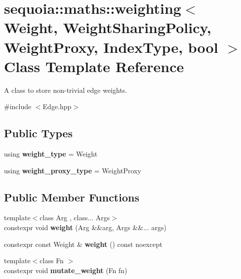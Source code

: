 \hypertarget{classsequoia_1_1maths_1_1weighting}{}\section{sequoia\+::maths\+::weighting$<$ Weight, Weight\+Sharing\+Policy, Weight\+Proxy, Index\+Type, bool $>$ Class Template Reference}
\label{classsequoia_1_1maths_1_1weighting}


A class to store non-\/trivial edge weights.  




{\ttfamily \#include $<$Edge.\+hpp$>$}

\subsection*{Public Types}
\begin{DoxyCompactItemize}
\item 
\mbox{\label{classsequoia_1_1maths_1_1weighting_a75487b5c1afdbff2be1311e6f55301e7}} 
using {\bfseries weight\+\_\+type} = Weight
\item 
\mbox{\label{classsequoia_1_1maths_1_1weighting_a80e6ac2ea9bf08c9094aecbc491d6db8}} 
using {\bfseries weight\+\_\+proxy\+\_\+type} = Weight\+Proxy
\end{DoxyCompactItemize}
\subsection*{Public Member Functions}
\begin{DoxyCompactItemize}
\item 
\mbox{\label{classsequoia_1_1maths_1_1weighting_aecf47e72218ef625141a6d3b18a07ddf}} 
{\footnotesize template$<$class Arg , class... Args$>$ }\\constexpr void {\bfseries weight} (Arg \&\&arg, Args \&\&... args)
\item 
\mbox{\label{classsequoia_1_1maths_1_1weighting_a53ce42cb7ec90e6eb370682e81bde115}} 
constexpr const Weight \& {\bfseries weight} () const noexcept
\item 
\mbox{\label{classsequoia_1_1maths_1_1weighting_ad38ca7bf1e4b385abda4e2c5020ed840}} 
{\footnotesize template$<$class Fn $>$ }\\constexpr void {\bfseries mutate\+\_\+weight} (Fn fn)
\end{DoxyCompactItemize}
